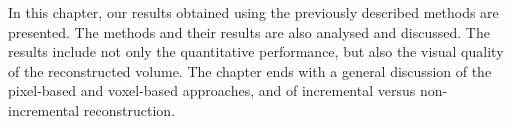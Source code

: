 
In this chapter, our results obtained using the previously described methods are presented. The methods and their results are also analysed and discussed. The results include not only the quantitative performance, but also the visual quality of the reconstructed volume. The chapter ends with a general discussion of the pixel-based and voxel-based approaches, and of incremental versus non-incremental reconstruction.
